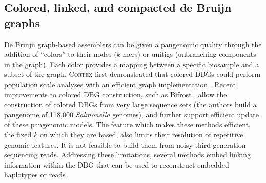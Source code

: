 


\subsection{Colored, linked, and compacted de Bruijn graphs}

De Bruijn graph-based assemblers can be given a pangenomic quality through the addition of ``colors'' to their nodes ($k$-mers) or unitigs (unbranching components in the graph).
Each color provides a mapping between a specific biosample and a subset of the graph.
\textsc{Cortex} first demonstrated that colored DBGs could perform population scale analyses with an efficient graph implementation \cite{Iqbal_2012}.
Recent improvements to colored DBG construction, such as Bifrost \cite{holley2019bifrost}, allow the construction of colored DBGs from very large sequence sets (the authors build a pangenome of 118,000 \emph{Salmonella} genomes), and further support efficient update of these pangenomic models.
The feature which makes these methods efficient, the fixed $k$ on which they are based, also limits their resolution of repetitive genomic features.
It is not feasible to build them from noisy third-generation sequencing reads.
Addressing these limitations, several methods embed linking information within the DBG that can be used to reconstruct embedded haplotypes or reads \cite{Bolger_2017,Turner_2018}.

